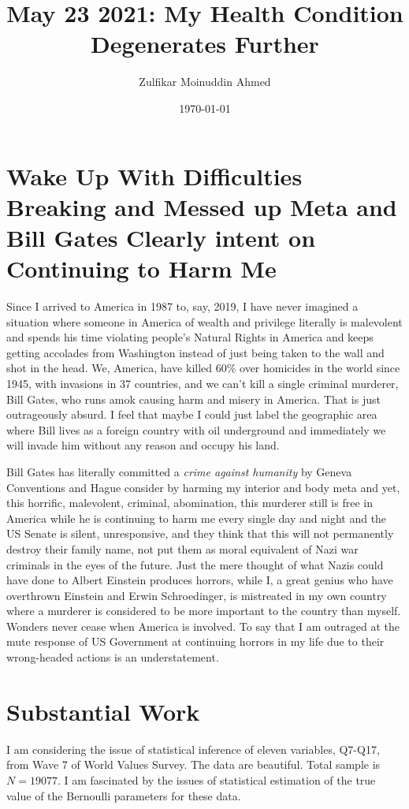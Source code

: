 \documentclass{amsart}
\title{May 23 2021:  My Health Condition Degenerates Further}
\author{Zulfikar Moinuddin Ahmed}
\date{\today}
\begin{document}
\maketitle

\section{Wake Up With Difficulties Breaking and Messed up Meta and Bill Gates Clearly intent on Continuing to Harm Me}

Since I arrived to America in 1987 to, say, 2019, I have never imagined a situation where someone in America of wealth and privilege literally is malevolent and spends his time violating people's Natural Rights in America and keeps getting accolades from Washington instead of just being taken to the wall and shot in the head.  We, America, have killed 60\% over homicides in the world since 1945, with invasions in 37 countries, and we can't kill a single criminal murderer, Bill Gates, who runs amok causing harm and misery in America.  That is just outrageously absurd.  I feel that maybe I could just label the geographic area where Bill lives as a foreign country with oil underground and immediately we will invade him without any reason and occupy his land.

Bill Gates has literally committed a {\em crime against humanity} by Geneva Conventions and Hague consider by harming my interior and body meta and yet, this horrific, malevolent, criminal, abomination, this murderer still is free in America while he is continuing to harm me every single day and night and the US Senate is silent, unresponsive, and they think that this will not permanently destroy their family name, not put them as moral equivalent of Nazi war criminals in the eyes of the future.   Just the mere thought of what Nazis could have done to Albert Einstein produces horrors, while I, a great genius who have overthrown Einstein and Erwin Schroedinger, is mistreated in my own country where a murderer is considered to be more important to the country than myself.  Wonders never cease when America is involved.  To say that I am outraged at the mute response of US Government at continuing horrors in my life due to their wrong-headed actions is an understatement.

\section{Substantial Work}

I am considering the issue of statistical inference of eleven variables, Q7-Q17, from Wave 7 of World Values Survey.  The data are beautiful. Total sample is $N=19077$.  I am fascinated by the issues of statistical estimation of the true value of the Bernoulli parameters for these data.  
\end{document}
